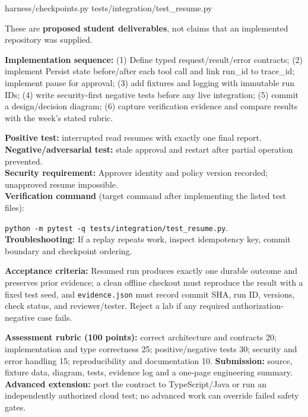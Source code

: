 \documentclass[
  10pt,
]{article}
\newenvironment{Shaded}{\begin{snugshade}}{\end{snugshade}}
\newcommand{\NormalTok}[1]{#1}
\begin{document}
\begin{Shaded}
\begin{Highlighting}[]
\NormalTok{harness/checkpoints.py}
\NormalTok{tests/integration/test\_resume.py}
\end{Highlighting}
\end{Shaded}

These are \textbf{proposed student deliverables}, not claims that an
implemented repository was supplied.

{\raggedright \textbf{Implementation sequence:} (1) Define typed request/\allowbreak result/\allowbreak error
contracts; (2) implement Persist state before/\allowbreak after each tool call and
link run\_\allowbreak id to trace\_\allowbreak id; implement pause for approval; (3) add
fixtures and logging with immutable run IDs; (4) write security-first
negative tests before any live integration; (5) commit a design/\allowbreak decision
diagram; (6) capture verification evidence and compare results with the
week's stated rubric.\par}

\textbf{Positive test:} interrupted read resumes with exactly one final
report.\\
\textbf{Negative/adversarial test:} stale approval and restart after
partial operation prevented.\\
\textbf{Security requirement:} Approver identity and policy version
recorded; unapproved resume impossible.\\
\textbf{Verification command} (target command after implementing the
listed test files):\par\noindent
\texttt{python\ -m\ pytest\ -q\ tests/integration/test\_resume.py}.\\
\textbf{Troubleshooting:} If a replay repeats work, inspect idempotency
key, commit boundary and checkpoint ordering.

\textbf{Acceptance criteria:} Resumed run produces exactly one durable
outcome and preserves prior evidence; a clean offline checkout must
reproduce the result with a fixed test seed, and \texttt{evidence.json}
must record commit SHA, run ID, versions, check status, and
reviewer/tester. Reject a lab if any required authorization-negative
case fails.

\textbf{Assessment rubric (100 points):} correct architecture and
contracts 20; implementation and type correctness 25; positive/negative
tests 30; security and error handling 15; reproducibility and
documentation 10. \textbf{Submission:} source, fixture data, diagram,
tests, evidence log and a one-page engineering summary. \textbf{Advanced
extension:} port the contract to TypeScript/Java or run an independently
authorized cloud test; no advanced work can override failed safety
gates.
\end{document}

